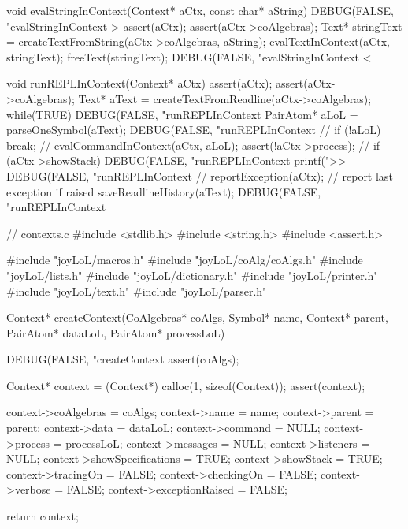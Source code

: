 void evalStringInContext(Context* aCtx, const char* aString) {
  DEBUG(FALSE, "evalStringInContext > %
  assert(aCtx);
  assert(aCtx->coAlgebras);
  Text* stringText = createTextFromString(aCtx->coAlgebras, aString);
  evalTextInContext(aCtx, stringText);
  freeText(stringText);
  DEBUG(FALSE, "evalStringInContext < %
}

void runREPLInContext(Context* aCtx) {
  assert(aCtx);
  assert(aCtx->coAlgebras);
  Text* aText = createTextFromReadline(aCtx->coAlgebras);
  while(TRUE) {
    DEBUG(FALSE, "runREPLInContext %
    PairAtom* aLoL = parseOneSymbol(aText);
    DEBUG(FALSE, "runREPLInContext %
    //
    if (!aLoL) break;
    //
    evalCommandInContext(aCtx, aLoL);
    assert(!aCtx->process);
    //
    if (aCtx->showStack) {
      DEBUG(FALSE, "runREPLInContext %
      printf(">>%
      DEBUG(FALSE, "runREPLInContext %
    }
    //
    reportException(aCtx); // report last exception if raised
  }
  saveReadlineHistory(aText);
  DEBUG(FALSE, "runREPLInContext %
}

\stopCCode

\stopJoyLoLWord

\stoptyping

\starttyping
// contexts.c
#include <stdlib.h>
#include <string.h>
#include <assert.h>

#include "joyLoL/macros.h"
#include "joyLoL/coAlg/coAlgs.h"
#include "joyLoL/lists.h"
#include "joyLoL/dictionary.h"
#include "joyLoL/printer.h"
#include "joyLoL/text.h"
#include "joyLoL/parser.h"

Context* createContext(CoAlgebras* coAlgs,
                       Symbol*   name,
                       Context*  parent,
                       PairAtom* dataLoL,
                       PairAtom* processLoL) {
  DEBUG(FALSE, "createContext %
  assert(coAlgs);

  Context* context = (Context*) calloc(1, sizeof(Context));
  assert(context);

  context->coAlgebras         = coAlgs;
  context->name               = name;
  context->parent             = parent;
  context->data               = dataLoL;
  context->command            = NULL;
  context->process            = processLoL;
  context->messages           = NULL;
  context->listeners          = NULL;
  context->showSpecifications = TRUE;
  context->showStack          = TRUE;
  context->tracingOn          = FALSE;
  context->checkingOn         = FALSE;
  context->verbose            = FALSE;
  context->exceptionRaised    = FALSE;

  return context;
}

